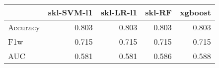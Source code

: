 \begin{tabular}{lrrrr}
\toprule
{} &  skl-SVM-l1 &  skl-LR-l1 &  skl-RF &  xgboost \\
\midrule
Accuracy &       0.803 &      0.803 &   0.803 &    0.803 \\
F1w      &       0.715 &      0.715 &   0.715 &    0.715 \\
AUC      &       0.581 &      0.581 &   0.586 &    0.588 \\
\bottomrule
\end{tabular}
